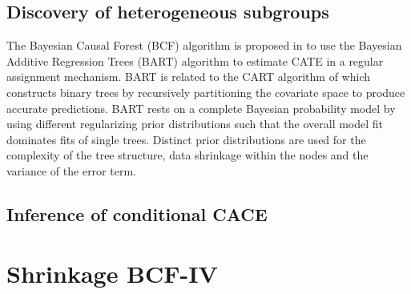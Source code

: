 \subsection{Discovery of heterogeneous subgroups}
\label{discovery}




The Bayesian Causal Forest (BCF) algorithm is proposed in \cite{hahn_bayesian_2020} to use the Bayesian Additive Regression Trees (BART) algorithm \cite{chipman_bart_2010} to estimate CATE in a regular assignment mechanism. BART is related to the CART algorithm of \cite{Breiman1984} which constructs binary trees by recursively partitioning the covariate space to produce accurate predictions.
BART rests on a complete Bayesian probability model by using different regularizing prior distributions such that the overall model fit dominates fits of single trees. Distinct prior distributions are used for the complexity of the tree structure, data shrinkage within the nodes and the variance of the error term. 




\subsection{Inference of conditional CACE}
\label{inference}


\section{Shrinkage BCF-IV}
\label{sec:SBCF-IV}



